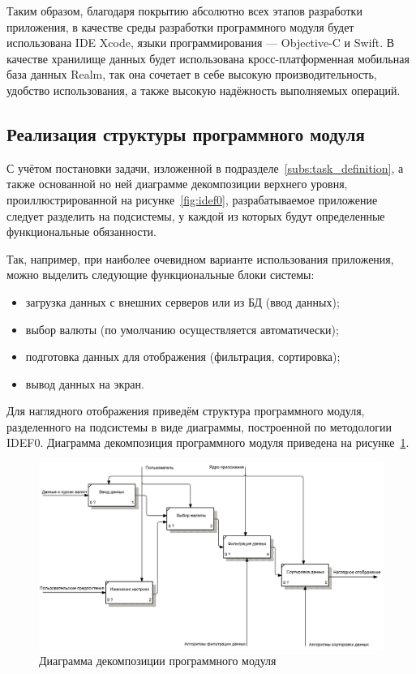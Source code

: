 Таким образом, благодаря покрытию абсолютно всех этапов разработки приложения,
в качестве среды разработки программного модуля будет использована IDE Xcode,
языки программирования --- Objective-C и Swift.
В качестве хранилище данных будет использована кросс-платформенная мобильная
база данных Realm, так она сочетает в себе высокую производительность,
удобство использования, а также высокую надёжность выполняемых операций.

\pagebreak



\subsection{Реализация структуры программного модуля}

С учётом постановки задачи, изложенной в подразделе~\ref{subs:task_definition},
а также основанной но ней диаграмме декомпозиции верхнего уровня,
проиллюстрированной на рисунке~\ref{fig:idef0}, разрабатываемое
приложение следует разделить на подсистемы, у каждой из которых будут
определенные функциональные обязанности.

Так, например, при наиболее очевидном варианте использования приложения,
можно выделить следующие функциональные блоки системы:
\begin{itemize}
  \item загрузка данных с внешних серверов или из БД (ввод данных);
  \item выбор валюты (по умолчанию осуществляется автоматически);
  \item подготовка данных для отображения (фильтрация, сортировка);
  \item вывод данных на экран.
\end{itemize}

Для наглядного отображения приведём структура программного модуля,
разделенного на подсистемы в виде диаграммы, построенной по методологии IDEF0.
Диаграмма декомпозиция программного модуля приведена
на рисунке~\ref{fig:idef0_structure}.
\begin{figure}[h!]
  \centering
  \includegraphics[width=160mm]{fig/IDEF0_structure}
  \caption{Диаграмма декомпозиции программного модуля}
  \label{fig:idef0_structure}
\end{figure}

